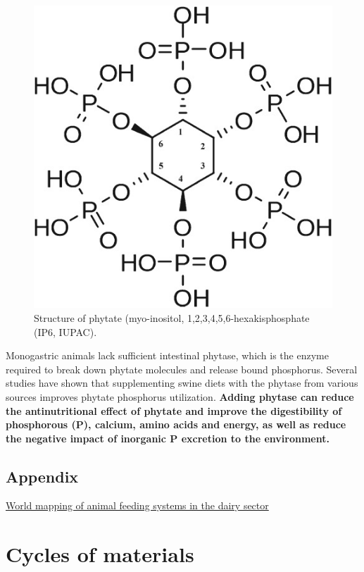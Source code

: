 \documentclass[]{book}
\begin{document}
\begin{figure}

{\centering \includegraphics[width=0.4\linewidth]{figures/phytate} 

}

\caption{Structure of phytate (myo-inositol, 1,2,3,4,5,6-hexakisphosphate (IP6, IUPAC).}\label{fig:phytate}
\end{figure}

Monogastric animals lack sufficient intestinal phytase, which is the
enzyme required to break down phytate molecules and release bound
phosphorus. Several studies have shown that supplementing swine diets
with the phytase from various sources improves phytate phosphorus
utilization. \textbf{Adding phytase can reduce the antinutritional
effect of phytate and improve the digestibility of phosphorous (P),
calcium, amino acids and energy, as well as reduce the negative impact
of inorganic P excretion to the environment.}

\section{Appendix}\label{appendix-3}

\href{http://www.fao.org/3/a-i3913e.pdf}{World mapping of animal feeding
systems in the dairy sector}

\chapter{Cycles of materials}\label{cycles-of-materials}
\end{document}
